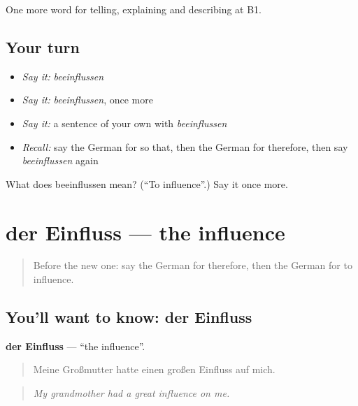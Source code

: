 \begin{grammarlens}[title={What you've built}]
One more word for telling, explaining and describing at B1.
\end{grammarlens}

\subsection*{Your turn}
\begin{itemize}
\raggedright
  \item \emph{Say it:} \emph{beeinflussen}
  \item \emph{Say it:} \emph{beeinflussen}, once more
  \item \emph{Say it:} a sentence of your own with \emph{beeinflussen}
  \item \emph{Recall:} say the German for so that, then the German for therefore, then say \emph{beeinflussen} again
\end{itemize}

\begin{tcolorbox}[breakable,colback=teal!4,colframe=teal!35!black,title={Before you move on}]
What does beeinflussen mean? (\textquotedblleft{}To influence\textquotedblright{}.) Say it once more.
\end{tcolorbox}
\section[der Einfluss]{der Einfluss — the influence}

\label{lesson:GE-C344-einfluss}



\begin{quote}
Before the new one: say the German for therefore, then the German for to influence.
\end{quote}

\subsection*{You'll want to know: der Einfluss}
\textbf{der Einfluss} — \textquotedblleft{}the influence\textquotedblright{}.

\begin{quote}
Meine Großmutter hatte einen großen Einfluss auf mich.
\end{quote}

\begin{quote}
\emph{My grandmother had a great influence on me.}
\end{quote}

